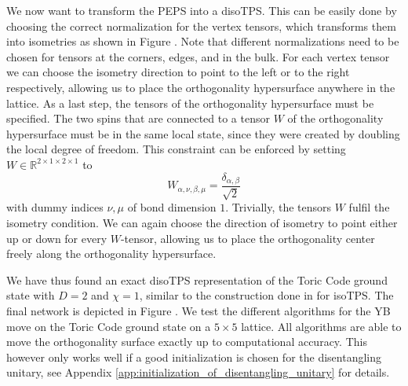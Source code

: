 We now want to transform the PEPS into a disoTPS. This can be easily done by choosing the correct normalization for the vertex tensors, which transforms them into isometries as shown in Figure . Note that different normalizations need to be chosen for tensors at the corners, edges, and in the bulk. For each vertex tensor we can choose the isometry direction to point to the left or to the right respectively, allowing us to place the orthogonality hypersurface anywhere in the lattice. As a last step, the tensors of the orthogonality hypersurface must be specified. The two spins that are connected to a tensor $W$ of the orthogonality hypersurface must be in the same local state, since they were created by doubling the local degree of freedom. This constraint can be enforced by setting $W\in\mathbb{R}^{2\times1\times2\times1}$ to
\begin{equation}
	W_{\alpha,\nu,\beta,\mu} = \frac{\delta_{\alpha,\beta}}{\sqrt{2}}
\end{equation} 
with dummy indices $\nu, \mu$ of bond dimension $1$. Trivially, the tensors $W$ fulfil the isometry condition. We can again choose the direction of isometry to point either up or down for every $W$-tensor, allowing us to place the orthogonality center freely along the orthogonality hypersurface.\par
We have thus found an exact disoTPS representation of the Toric Code ground state with $D = 2$ and $\chi= 1$, similar to the construction done in \cite{cite:isometric_tensor_network_representation_of_string_net_liquids} for isoTPS. The final network is depicted in Figure . We test the different algorithms for the YB move on the Toric Code ground state on a $5\times5$ lattice. All algorithms are able to move the orthogonality surface exactly up to computational accuracy. This however only works well if a good initialization is chosen for the disentangling unitary, see Appendix \ref{app:initialization_of_disentangling_unitary} for details.